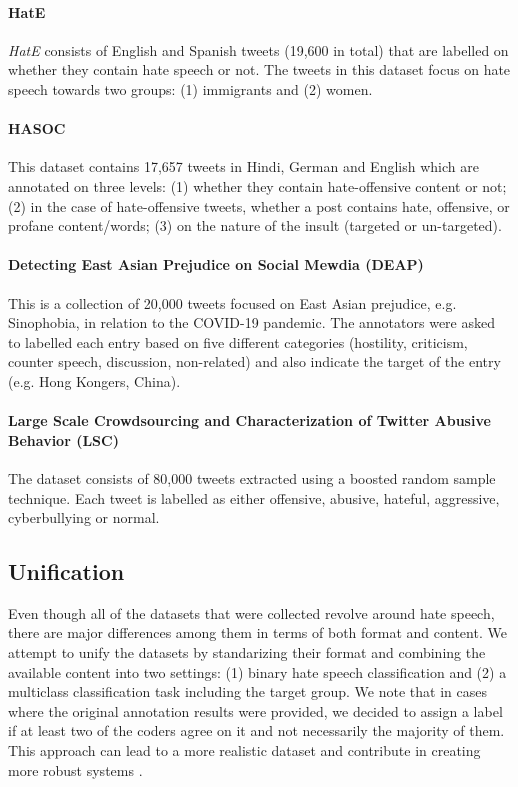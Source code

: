     \paragraph{HatE}
    \textit{HatE} \cite{basile2019semeval} consists of English and Spanish tweets (19,600 in total) that are labelled on whether they contain hate speech or not. The tweets in this dataset focus on hate speech towards two groups: (1) immigrants and (2) women.

    \paragraph{HASOC}
    This dataset  \cite{mandl2019overview} contains 17,657 tweets in Hindi, German and English which are annotated on three levels: (1) whether they contain hate-offensive content or not; (2) in the case of hate-offensive tweets, whether a post contains hate, offensive, or profane content/words; (3) on the nature of the insult (targeted or un-targeted).

    \paragraph{Detecting East Asian Prejudice on Social Mewdia (DEAP)}
    This is a collection of 20,000 tweets \cite{vidgen-etal-2020-detecting} focused on East Asian prejudice, e.g. Sinophobia, in relation to the COVID-19 pandemic. The annotators were asked to labelled each entry based on five different categories (hostility, criticism, counter speech, discussion, non-related) and also indicate the target of the entry (e.g. Hong Kongers, China).
   
    \paragraph{Large Scale Crowdsourcing and Characterization of Twitter Abusive Behavior (LSC)}
    The dataset \cite{founta2018large} consists of 80,000 tweets extracted using a boosted random sample technique. Each tweet is labelled as either offensive, abusive, hateful, aggressive, cyberbullying or normal. 
    
    
    \subsection{Unification}
    Even though all of the datasets that were collected revolve around hate speech, there are major differences among them in terms of both format and content. We attempt to unify the datasets by standarizing their format and combining the available content into two settings: (1) binary hate speech classification and (2) a multiclass classification task including the target group.  We note that in cases where the original annotation results were provided, we decided to assign a label if at least two of the coders agree on it and not necessarily the majority of them. This approach can lead to a more realistic dataset and contribute in creating more robust systems \cite{antypas2022twitter, mohammad2018semeval}.
    \label{unification}
